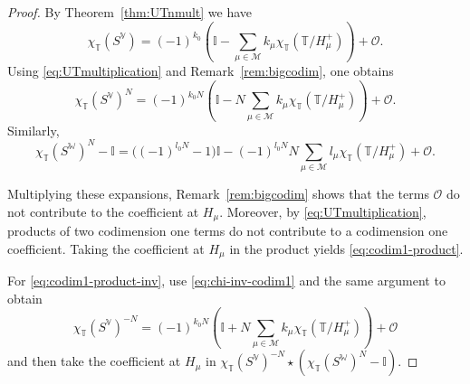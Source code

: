 \documentclass[10pt,a4paper]{amsart}
\newcommand{\bI}{\mathbb{I}}
\newcommand{\bT}{\mathbb{T}}
\newcommand{\bV}{\mathbb{V}}
\newcommand{\bW}{\mathbb{W}}
\newcommand{\cM}{\mathcal{M}}
\newcommand{\cO}{\mathcal{O}}
\begin{document}
\begin{proof}
By Theorem~\ref{thm:UTnmult} we have
\[
\chi_\bT(S^\bV)=(-1)^{k_0}\left(\bI-\sum_{\mu\in\cM}k_\mu\chi_\bT(\bT/H_\mu^+)\right)+\cO.
\]
Using \eqref{eq:UTmultiplication} and Remark~\ref{rem:bigcodim}, one obtains
\[
\chi_\bT(S^\bV)^N=(-1)^{k_0N}\left(\bI-N\sum_{\mu\in\cM}k_\mu\chi_\bT(\bT/H_\mu^+)\right)+\cO.
\]
Similarly,
\[
\chi_\bT(S^\bW)^N-\bI=\bigl((-1)^{l_0N}-1\bigr)\bI-(-1)^{l_0N}N\sum_{\mu\in\cM}l_\mu\chi_\bT(\bT/H_\mu^+)+\cO.
\]

Multiplying these expansions, Remark~\ref{rem:bigcodim} shows that the terms $\cO$ do not contribute to the coefficient at $H_\mu$. Moreover, by \eqref{eq:UTmultiplication}, products of two codimension one terms do not contribute to a codimension one coefficient. Taking the coefficient at $H_\mu$ in the product yields \eqref{eq:codim1-product}.

For \eqref{eq:codim1-product-inv}, use \eqref{eq:chi-inv-codim1} and the same argument to obtain
\[
\chi_\bT(S^\bV)^{-N}=(-1)^{k_0N}\left(\bI+N\sum_{\mu\in\cM}k_\mu\chi_\bT(\bT/H_\mu^+)\right)+\cO
\]
and then take the coefficient at $H_\mu$ in
$\chi_\bT(S^\bV)^{-N}\star(\chi_\bT(S^\bW)^N-\bI)$.

\end{proof}
\end{document}
